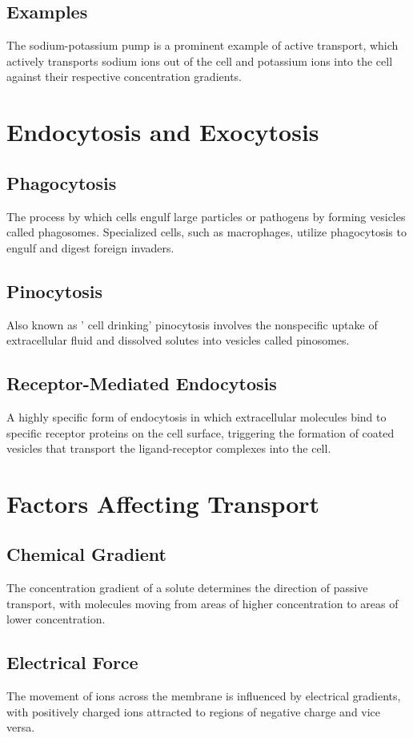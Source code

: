 \documentclass{article}
\begin{document}
\subsection{Examples}
The sodium-potassium pump is a prominent example of active transport, which actively transports sodium ions out of the cell and potassium ions into the cell against their respective concentration gradients.

\section{Endocytosis and Exocytosis}

\subsection{Phagocytosis}
The process by which cells engulf large particles or pathogens by forming vesicles called phagosomes. Specialized cells, such as macrophages, utilize phagocytosis to engulf and digest foreign invaders.

\subsection{Pinocytosis}
Also known as ' cell drinking' pinocytosis involves the nonspecific uptake of extracellular fluid and dissolved solutes into vesicles called pinosomes.

\subsection{Receptor-Mediated Endocytosis}
A highly specific form of endocytosis in which extracellular molecules bind to specific receptor proteins on the cell surface, triggering the formation of coated vesicles that transport the ligand-receptor complexes into the cell.

\section{Factors Affecting Transport}

\subsection{Chemical Gradient}
The concentration gradient of a solute determines the direction of passive transport, with molecules moving from areas of higher concentration to areas of lower concentration.

\subsection{Electrical Force}
The movement of ions across the membrane is influenced by electrical gradients, with positively charged ions attracted to regions of negative charge and vice versa.
\end{document}
